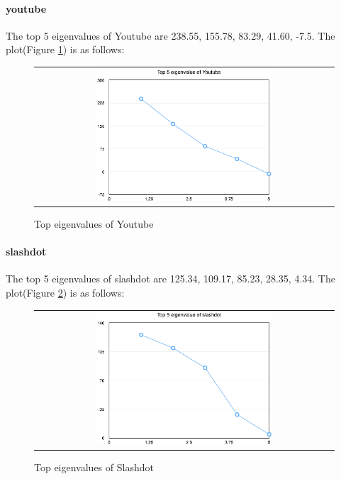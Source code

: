 \paragraph{youtube}
The top 5 eigenvalues of Youtube are 238.55, 155.78, 83.29, 41.60, -7.5. The plot(Figure \ref{t5:youtube}) is as follows:
\begin{figure}[!htbf]
\begin{center}
\begin{tabular}{c}
     \includegraphics[width=0.6\textwidth]{FIG/t5_youtube.png}\\
\end{tabular}
\caption{Top eigenvalues of Youtube}
\label{t5:youtube}
\end{center}
\end{figure}

\paragraph{slashdot}
The top 5 eigenvalues of slashdot are 125.34, 109.17, 85.23, 28.35, 4.34. The plot(Figure \ref{t5:slashdot}) is as follows:
\begin{figure}[!htbf]
\begin{center}
\begin{tabular}{c}
     \includegraphics[width=0.6\textwidth]{FIG/t5_slashdot.png}\\
\end{tabular}
\caption{Top eigenvalues of Slashdot}
\label{t5:slashdot}
\end{center}
\end{figure}

